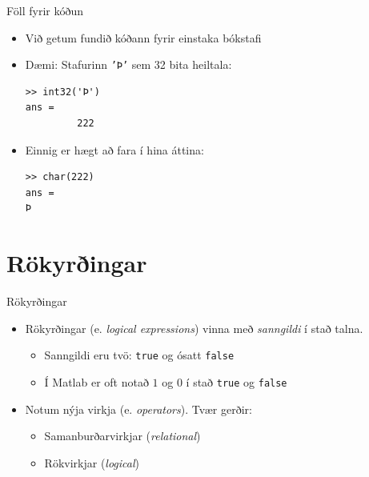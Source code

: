 \documentclass{beamer}
\begin{document}
\begin{frame}[fragile]{Föll fyrir kóðun}
\begin{itemize}
 \item Við getum fundið kóðann fyrir einstaka bókstafi
 \item Dæmi: Stafurinn \texttt{'Þ'} sem 32 bita heiltala: 
\begin{verbatim}
>> int32('Þ')
ans =
         222
\end{verbatim}
 \item Einnig er hægt að fara í hina áttina:
\begin{verbatim}
>> char(222)
ans =
Þ
\end{verbatim}
\end{itemize}
\end{frame}

\section{Rökyrðingar}

\begin{frame}{Rökyrðingar}
\begin{itemize}
 \item Rökyrðingar (e. \emph{logical expressions}) vinna með \emph{sanngildi} í stað talna.
 \begin{itemize}
  \item Sanngildi eru tvö: \texttt{true} og ósatt \texttt{false}
  \item Í Matlab er oft notað $1$ og $0$ í stað \texttt{true} og \texttt{false}
 \end{itemize}
 \item Notum nýja virkja (e. \emph{operators}). Tvær gerðir:
 \begin{itemize}
  \item Samanburðarvirkjar (\emph{relational})
  \item Rökvirkjar (\emph{logical})
 \end{itemize}
\end{itemize}
\end{frame}
\end{document}
